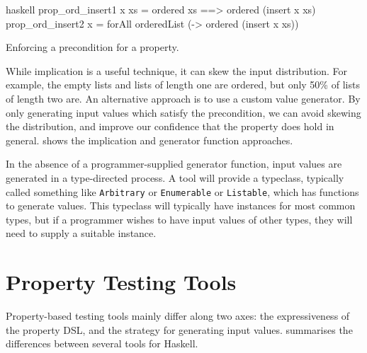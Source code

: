 \begin{listing}
\centering
\begin{cminted}{haskell}
prop_ord_insert1 x xs = ordered xs ==> ordered (insert x xs)
prop_ord_insert2 x    = forAll orderedList (\xs -> ordered (insert x xs))
\end{cminted}
\caption{Enforcing a precondition for a property.}\label{lst:prop_ord_insert}
\end{listing}

While implication is a useful technique, it can skew the input
distribution.  For example, the empty lists and lists of length one
are ordered, but only 50\% of lists of length two are.  An alternative
approach is to use a custom value generator.  By only generating input
values which satisfy the precondition, we can avoid skewing the
distribution, and improve our confidence that the property does hold
in general.   shows the implication and
generator function approaches.

In the absence of a programmer-supplied generator function, input
values are generated in a type-directed process.  A tool will provide
a typeclass, typically called something like \verb|Arbitrary| or
\verb|Enumerable| or \verb|Listable|, which has functions to generate
values.  This typeclass will typically have instances for most common
types, but if a programmer wishes to have input values of other types,
they will need to supply a suitable instance.

\section{Property Testing Tools}
\label{sec:property_testing-tools}

Property-based testing tools mainly differ along two axes: the
expressiveness of the property DSL, and the strategy for generating
input values.   summarises the differences between
several tools for Haskell.

\begingroup
\newcommand{\YY}{\CIRCLE}
\newcommand{\NN}{\Circle}
\newcommand{\YN}{\LEFTcircle}
\newcommand{\QQ}{\NN$^p$}

